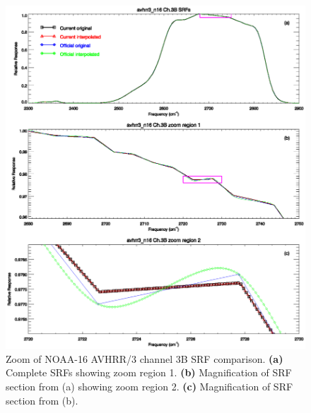\begin{figure}[htp]
  \centering
  \includegraphics[scale=1]{graphics/zoom/avhrr3_n16.ch3.srf.zoom.eps}
  \caption{Zoom of NOAA-16 AVHRR/3 channel 3B SRF comparison. \textbf{(a)} Complete SRFs showing zoom region 1. \textbf{(b)} Magnification of SRF section from (a) showing zoom region 2.  \textbf{(c)} Magnification of SRF section from (b).}
  \label{fig:avhrr3_n16.ch3.srf.zoom}
\end{figure}

